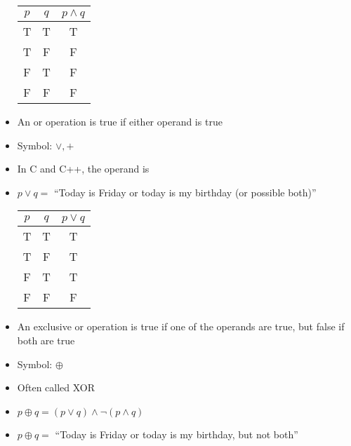 \begin{itemize}
    \begin{center}
      \begin{tabular}[h]{|c|c|c|}
        \hline
        $p$ & $q$ & $p\wedge q$\\
        \hline
        T & T & T\\
        \hline
        T & F & F\\
        \hline
        F & T & F\\
        \hline
        F & F & F\\
        \hline
      \end{tabular}
    \end{center}

  \item An or operation is true if either operand is true

  \item Symbol: $\vee,+$

  \item In C and C++, the operand is \parallel 

  \item $p\vee q=$ ``Today is Friday or today is my birthday (or possible both)''

    \begin{center}
      \begin{tabular}[h]{|c|c|c|}
        \hline
        $p$ & $q$ & $p\vee q$\\
        \hline
        T & T & T\\
        \hline
        T & F & T\\
        \hline
        F & T & T\\
        \hline
        F & F & F\\
        \hline
      \end{tabular}
    \end{center}

  \item An exclusive or operation is true if one of the operands are true, but false if both are true

  \item Symbol: $\oplus$

  \item Often called XOR

  \item $p\oplus q=(p\vee q)\wedge\neg(p\wedge q)$

  \item $p\oplus q=$ ``Today is Friday or today is my birthday, but not both''


\end{itemize}
